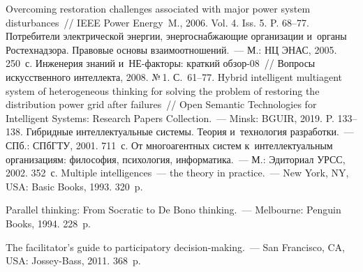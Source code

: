 \begin{multicols}{2}
{\small\frenchspacing
 {%
 \begin{thebibliography}{99}
   Overcoming restoration challenges associated with major 
power system disturbances~// IEEE Power Energy~M., 2006. Vol. 4. Iss. 5. P. 68--77.
   Потребители электрической энергии, энергоснабжающие организации 
  и~органы Ростехнадзора. Правовые основы взаимоотношений.~--- М.: НЦ ЭНАС, 2005. 250~с.
   Инженерия знаний и~НЕ-факторы: краткий обзор-08~// Вопросы 
искусственного интеллекта, 2008. №\,1. С.~61--77.
  Hybrid intelligent multiagent system of heterogeneous 
thinking for solving the problem of restoring the distribution
 power grid after failures~// Open 
Semantic Technologies for Intelligent Systems: 
Research Papers Collection.~--- 
Minsk: BGUIR, 2019. P. 133--138.
   Гибридные интеллектуальные системы. Теория и~технология 
разработки.~--- СПб.: \mbox{СПбГТУ}, 2001. 711~с.
   От многоагентных систем к~интеллектуальным организациям: 
философия, психология, информатика.~--- М.: Эдиториал УРСС, 2002. 352~с.
   Multiple intelligences~--- the theory in practice.~--- New York, NY, USA: 
Basic Books, 1993. 320~p.

   Parallel thinking: From Socratic to De Bono thinking.~--- Melbourne: Penguin 
Books, 1994. 228~p.

   The facilitator's guide to participatory 
decision-making.~--- San Francisco, CA, USA: Jossey-Bass, 2011. 368~p.


\end{thebibliography}}}
\end{multicols}

